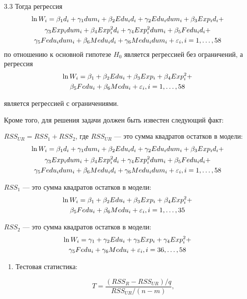 \begin{solution}{{3.3}}
Тогда регрессия
\begin{multline*}
\ln W_i=\beta_1 d_i+\gamma_1 dum_i+\beta_2 Edu_i d_i+\gamma_2 Edu_i dum_i+\beta_3 Exp_i d_i+\\
\gamma_3 Exp_i dum_i+\beta_4 Exp_i^2 d_i+
\gamma_4 Exp_i^2 dum_i+\beta_5 Fedu_i d_i +\\
\gamma_5 Fedu_i dum_i+\beta_6 Medu_i d_i+\gamma_6 Medu_i dum_i+\varepsilon_i, i=1, \ldots, 58
\end{multline*}
по отношению к основной гипотезе $H_0$ является регрессией без ограничений, а регрессия
\begin{multline*}
\ln W_i=\beta_1 +\beta_2 Edu_i+\beta_3 Exp_i+\beta_4 Exp_i^2+\\
\beta_5 Fedu_i+\beta_6 Medu_i+\varepsilon_i, i=1, \ldots, 58
\end{multline*}

является регрессией с ограничениями.

Кроме того, для решения задачи должен быть известен следующий факт:

$RSS_{UR}=RSS_1+RSS_2$, где $RSS_{UR}$ — это сумма квадратов остатков в модели:
\begin{multline*}
\ln W_i=\beta_1  d_i+\gamma_1 dum_i+\beta_2 Edu_i d_i+\gamma_2 Edu_i dum_i+\beta_3 Exp_i d_i+\\
\gamma_3 Exp_i dum_i+\beta_4 Exp_i^2 d_i
+ \gamma_4 Exp_i^2 dum_i+\beta_5 Fedu_i d _i +\\
\gamma_5 Fedu_i dum_i+\beta_6 Medu_i d_i+\gamma_6 Medu_i dum_i+\varepsilon_i, i=1, \ldots, 58
\end{multline*}

$RSS_1$ — это сумма квадратов остатков в модели:
\begin{multline*}
\ln W_i=\beta_1 +\beta_2 Edu_i+\beta_3 Exp_i+\beta_4 Exp_i^2+\\
\beta_5 Fedu_i+\beta_6 Medu_i+\varepsilon_i, i=1, \ldots, 35
\end{multline*}

$RSS_2$ — это сумма квадратов остатков в модели:
\begin{multline*}
\ln W_i=\gamma_1 +\gamma_2 Edu_i+\gamma_3 Exp_i+\gamma_4 Exp_i^2+\\
\gamma_5 Fedu_i+\gamma_6 Medu_i+\varepsilon_i, i=36, \ldots, 58
\end{multline*}


\begin{enumerate}
\item Тестовая статистика:

\[
T = \frac{(RSS_R-RSS_{UR})/q}{RSS_{UR}/(n-m)},
\]


\end{enumerate}
\end{solution}
